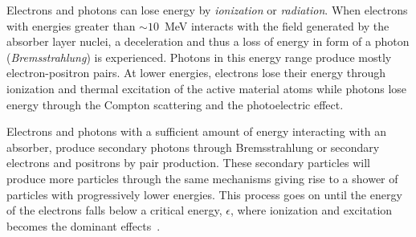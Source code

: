 Electrons and photons can lose energy by \emph{ionization} or
\emph{radiation}. When electrons with energies greater than $\sim 10$~MeV
interacts with the field generated by the absorber layer nuclei, a deceleration
and thus a loss of energy in form of a photon (\emph{Bremsstrahlung}) is
experienced. Photons in this energy range produce mostly electron-positron
pairs. At lower energies, electrons lose their energy through ionization and
thermal excitation of the active material atoms while photons lose energy
through the Compton scattering and the photoelectric effect.

Electrons and photons with a sufficient amount of energy interacting with an
absorber, produce secondary photons through Bremsstrahlung or secondary
electrons and positrons by pair production. These secondary particles will
produce more particles through the same mechanisms giving rise to a shower of
particles with progressively lower energies. This process goes on until the
energy of the electrons falls below a critical energy, $\epsilon$, where
ionization and excitation becomes the dominant effects~\cite{Calorimetry}.
